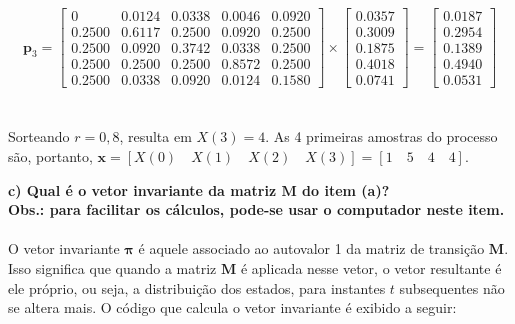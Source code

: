 \documentclass{report}
\begin{document}
\begin{equation*}
\mathbf{p}_3 = \left[ 
\begin{array}{ccccc}
0 & 0.0124 & 0.0338 & 0.0046 & 0.0920 \\ 
0.2500 & 0.6117 & 0.2500 & 0.0920 & 0.2500 \\ 
0.2500 & 0.0920 & 0.3742 & 0.0338 & 0.2500 \\ 
0.2500 & 0.2500 & 0.2500 & 0.8572 & 0.2500 \\ 
0.2500 & 0.0338 & 0.0920 & 0.0124 & 0.1580
\end{array} \right] \times \left[\begin{array}{c}
0.0357 \\ 
0.3009 \\ 
0.1875 \\ 
0.4018 \\
0.0741
\end{array} \right] =  \left[\begin{array}{c}
0.0187 \\ 
0.2954 \\ 
0.1389 \\ 
0.4940 \\
0.0531
\end{array} \right]
\end{equation*}\\

\paragraph{} Sorteando $r = 0,8$, resulta em $X(3) = 4$. As 4 primeiras amostras do processo são, portanto, $\mathbf{x} = [X(0) \quad X(1) \quad X(2) \quad X(3)] = [1 \quad 5 \quad 4 \quad 4]$.

\textbf{c) Qual é o vetor invariante da matriz $\mathbf{M}$ do item (a)?}\\

\textbf{Obs.: para facilitar os cálculos, pode-se usar o computador neste item.}\\

\paragraph{} O vetor invariante $\boldsymbol{\pi}$ é aquele associado ao autovalor 1 da matriz de transição $\mathbf{M}$. Isso significa que quando a matriz $\mathbf{M}$ é aplicada nesse vetor, o vetor resultante é ele próprio, ou seja, a distribuição dos estados, para instantes $t$ subsequentes não se altera mais. O código que calcula o vetor invariante é exibido a seguir:\\
\end{document}
